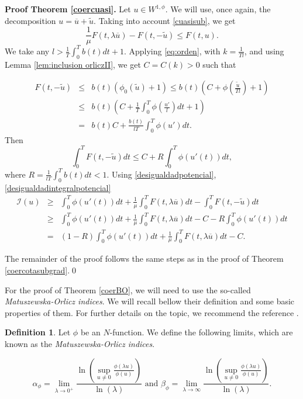 \documentclass[twoside]{article}
\theoremstyle{definition}
\newtheorem{definition}{Definition}[section]
\theoremstyle{plain}
\theoremstyle{remark}
\begin{document}
\noindent\textbf{Proof Theorem \ref{coercuasi}.} Let $u \in W^{1,\phi}$. We will use, once again, the decomposition
$u=\overline{u}+\tilde{u}$.  Taking into account \ref{cuasisub}, we get
\begin{equation}\label{desigualdadpotencial}
 \frac{1}{\mu}F(t,\lambda\overline{u})-F(t,-\tilde{u})\leq F(t,u).
\end{equation}
We take any $l>\frac{1}{T}\int_{0}^{T}b(t)dt+1$. Applying   \eqref{eq:orden},   with  $ k=\frac{1}{Tl}$, and using Lemma \ref{lem:inclusion orliczII}, we get $C=C(k)>0$ such that

\begin{eqnarray*}
F(t,-\tilde{u})&\leq& b(t)(\phi_0(\tilde{u})+1)\leq b(t)\left(C+\phi\left(\frac{\tilde{u}}{Tl}\right)+1\right)\\
&\leq&b(t)\left(C+\frac{1}{T}\int_0^T\phi\left(\frac{u'}{l}\right)dt+1\right)\\
&=& b(t)C+\frac{b(t)}{lT}\int_0^T\phi\left(u'\right)dt.
\end{eqnarray*}
Then
\begin{equation}\label{desigualdadintegralpotencial}
\int_0^T F(t,-\tilde{u})dt\leq C+R\int_0^T\phi(u'(t))dt,
\end{equation}
where $R= \frac{1}{lT}\int_{0}^{T}b(t)dt<1$.
Using \eqref{desigualdadpotencial}, \eqref{desigualdadintegralpotencial}
\begin{eqnarray*}
\mathcal{I}(u)
&\geq& \int_0^T\phi(u'(t))dt+\frac{1}{\mu} \int_0^T F(t,\lambda\overline{u})dt-\int_0^T F(t,-\tilde{u})dt\\
&\geq&\int_0^T \phi(u'(t))dt + \frac{1}{\mu} \int_0^T F(t,\lambda\overline{u})dt - C-R\int_0^T\phi(u'(t))dt\\
&=& (1-R)\int_0^T\phi(u'(t))dt+ \frac{1}{\mu} \int_0^T F(t,\lambda\overline{u})dt -C.
\end{eqnarray*}

The remainder of the proof follows the same steps as in the proof of  Theorem \ref{coercotasubgrad}.\qed


For the proof of Theorem \ref{coerBO}, we will need to use the so-called \emph{Matuszewska-Orlicz indices}. We will recall bellow their definition and  some basic properties of them. For further details on the topic, we recommend the reference \cite{m}.

\begin{definition}\label{definicionoindices}
Let $\phi$ be an $N$-function. We define the following limits, which are known as the \emph{Matuszewska-Orlicz indices}.

\[
\alpha_{\phi} = \lim_{\lambda \rightarrow 0^+} \frac{\ln\left(\sup_{u \neq 0} \frac{\phi(\lambda u)}{\phi(u)}\right)}{\ln(\lambda)} \text{ and } \beta_{\phi} = \lim_{\lambda \rightarrow \infty} \frac{\ln\left(\sup_{u \neq 0} \frac{\phi(\lambda u)}{\phi(u)}\right)}{\ln(\lambda)}.
\]

\end{definition}
\end{document}
